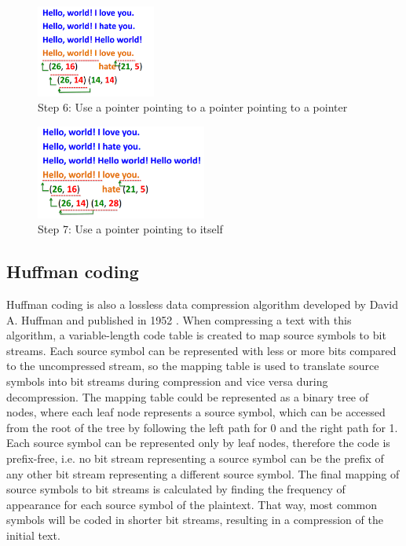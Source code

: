 \begin{figure}[H] \caption{Step 6: Use a pointer pointing to a pointer pointing
to a pointer} \centering
\includegraphics[width=0.35\textwidth]{diagrams/lz77_6.png}\end{figure}
\begin{figure}[H] \caption{Step 7: Use a pointer pointing to itself} \centering
\includegraphics[width=0.5\textwidth]{diagrams/lz77_7.png}\end{figure}

\subsection{Huffman coding}\label{subsec:huffman}

Huffman coding is also a lossless data compression algorithm developed by David
A. Huffman and published in 1952 \cite{huffman}. When compressing a text with
this algorithm, a variable-length code table is created to map source symbols to
bit streams. Each source symbol can be represented with less or more bits
compared to the uncompressed stream, so the mapping table is used to translate
source symbols into bit streams during compression and vice versa during
decompression. The mapping table could be represented as a binary tree of nodes,
where each leaf node represents a source symbol, which can be accessed from the
root of the tree by following the left path for 0 and the right path for 1. Each
source symbol can be represented only by leaf nodes, therefore the code is
prefix-free, i.e. no bit stream representing a source symbol can be the prefix
of any other bit stream representing a different source symbol. The final
mapping of source symbols to bit streams is calculated by finding the frequency
of appearance for each source symbol of the plaintext. That way, most common
symbols will be coded in shorter bit streams, resulting in a compression of the
initial text.


